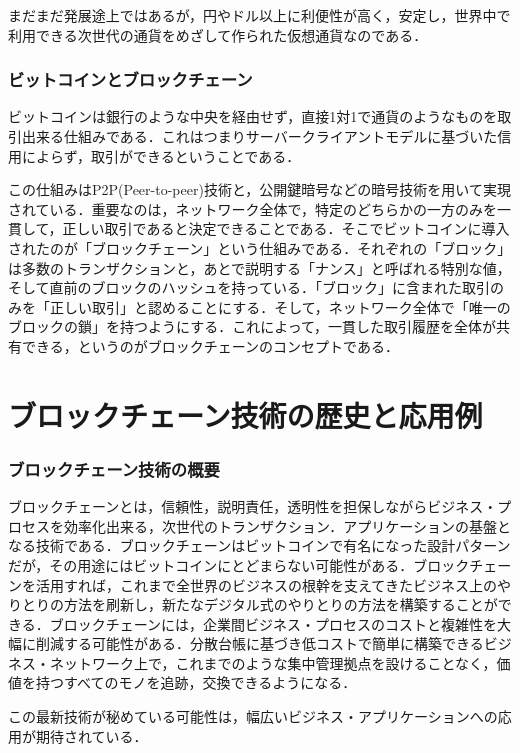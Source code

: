 まだまだ発展途上ではあるが，円やドル以上に利便性が高く，安定し，世界中で利用できる次世代の通貨をめざして作られた仮想通貨なのである．

\subsubsection{ビットコインとブロックチェーン}
ビットコインは銀行のような中央を経由せず，直接1対1で通貨のようなものを取引出来る仕組みである．これはつまりサーバークライアントモデルに基づいた信用によらず，取引ができるということである．

この仕組みはP2P(Peer-to-peer)技術と，公開鍵暗号などの暗号技術を用いて実現されている．重要なのは，ネットワーク全体で，特定のどちらかの一方のみを一貫して，正しい取引であると決定できることである．そこでビットコインに導入されたのが「ブロックチェーン」という仕組みである．それぞれの「ブロック」は多数のトランザクションと，あとで説明する「ナンス」と呼ばれる特別な値，そして直前のブロックのハッシュを持っている．「ブロック」に含まれた取引のみを「正しい取引」と認めることにする．そして，ネットワーク全体で「唯一のブロックの鎖」を持つようにする．これによって，一貫した取引履歴を全体が共有できる，というのがブロックチェーンのコンセプトである．

\newpage

\section{ブロックチェーン技術の歴史と応用例}

\subsubsection{ブロックチェーン技術の概要}

ブロックチェーンとは，信頼性，説明責任，透明性を担保しながらビジネス・プロセスを効率化出来る，次世代のトランザクション．アプリケーションの基盤となる技術である．ブロックチェーンはビットコインで有名になった設計パターンだが，その用途にはビットコインにとどまらない可能性がある．ブロックチェーンを活用すれば，これまで全世界のビジネスの根幹を支えてきたビジネス上のやりとりの方法を刷新し，新たなデジタル式のやりとりの方法を構築することができる．ブロックチェーンには，企業間ビジネス・プロセスのコストと複雑性を大幅に削減する可能性がある．分散台帳に基づき低コストで簡単に構築できるビジネス・ネットワーク上で，これまでのような集中管理拠点を設けることなく，価値を持つすべてのモノを追跡，交換できるようになる．

この最新技術が秘めている可能性は，幅広いビジネス・アプリケーションへの応用が期待されている．

